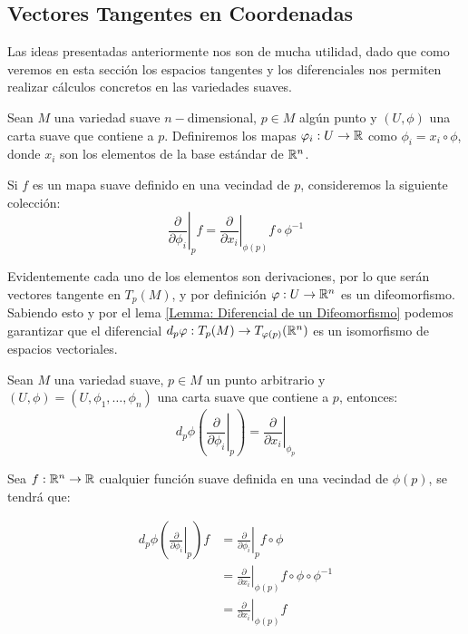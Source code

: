 \subsection{Vectores Tangentes en Coordenadas}\label{Subsección: Espacios Tangentes en Coordenadas}
Las ideas presentadas anteriormente nos son de mucha utilidad, dado que como veremos en esta sección los espacios tangentes y los diferenciales nos permiten realizar cálculos concretos en las variedades suaves.

Sean $M$ una variedad suave $n-$dimensional, $p \in M$ algún punto y $(U,\phi)$ una carta suave que contiene a $p$. Definiremos los mapas $\varphi_i: U \to \mathbb{R}$ como $\phi_{i} = x_i \circ \phi$, donde $x_i$ son los elementos de la base estándar de $\mathbb{R}^n$.

Si $f$ es un mapa suave definido en una vecindad de $p$, consideremos la siguiente colección:
\[
	\left. \frac{\partial}{\partial \phi_i} \right|_{p} f = \left. \frac{\partial}{\partial x_i} \right|_{\phi(p)} f \circ \phi^{-1}
\]

Evidentemente cada uno de los elementos son derivaciones, por lo que serán vectores tangente en $T_p(M)$, y por definición $\varphi: U \to \mathbb{R}^n$ es un difeomorfismo. Sabiendo esto y por el lema \ref{Lemma: Diferencial de un Difeomorfismo} podemos garantizar que el diferencial $d_p\varphi: T_p(M) \to T_{\varphi(p)}(\mathbb{R}^n)$ es un isomorfismo de espacios vectoriales.

\begin{lemma}\label{Lemma: Definicion Vector Coordenado}
	Sean $M$ una variedad suave, $p \in M$ un punto arbitrario y $(U,\phi) = (U, \phi_1, \dots, \phi_n)$ una carta suave que contiene a $p$, entonces:
	\[
		d_p\phi \left( \left. \frac{\partial }{\partial \phi_i}\right|_{p}\right) = \left. \frac{\partial}{\partial x_i} \right|_{\phi_p}
	\]
\end{lemma}

Sea $f: \mathbb{R}^n \to \mathbb{R}$ cualquier función suave definida en una vecindad de $\phi(p)$, se tendrá que:

\begin{align*}
	d_p\phi \left( \left. \frac{\partial}{\partial \phi_i} \right|_{p} \right) f & = \left. \frac{\partial}{\partial \phi_i} \right|_{p} f \circ \phi                    \\
	                                                                             & = \left. \frac{\partial}{\partial x_i} \right|_{\phi(p)} f \circ \phi \circ \phi^{-1} \\
	                                                                             & = \left. \frac{\partial}{\partial x_i}\right|_{\phi(p)} f
\end{align*}


